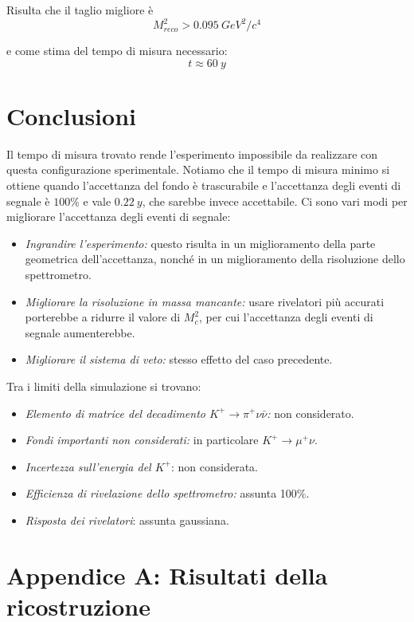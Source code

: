 \documentclass[8pt]{extarticle}
\begin{document}
Risulta che il taglio migliore è 
$$
M^2_{reco} > 0.095\ GeV^2/c^4
$$

e come stima del tempo di misura necessario:
$$
t \approx 60\ y
$$

\newpage

\section{Conclusioni} \label{sec:conclusioni}

Il tempo di misura trovato rende l'esperimento impossibile da realizzare con questa configurazione sperimentale. Notiamo che il tempo di misura minimo si ottiene quando l'accettanza del fondo è trascurabile e l'accettanza degli eventi di segnale è $100\%$ e vale $0.22\ y$, che sarebbe invece accettabile. Ci sono vari modi per migliorare l'accettanza degli eventi di segnale:

\begin{itemize}
\item \textit{Ingrandire l'esperimento:} questo risulta in un miglioramento della parte geometrica dell'accettanza, nonché in un miglioramento della risoluzione dello spettrometro.
\item \textit{Migliorare la risoluzione in massa mancante:} usare rivelatori più accurati porterebbe a ridurre il valore di $M^2_c$, per cui l'accettanza degli eventi di segnale aumenterebbe.
\item \textit{Migliorare il sistema di veto:} stesso effetto del caso precedente.
\end{itemize}

Tra i limiti della simulazione si trovano:
\begin{itemize}
\item \textit{Elemento di matrice del decadimento $K^+ \rightarrow \pi^+ \nu \bar{\nu}$:} non considerato.
\item \textit{Fondi importanti non considerati:} in particolare $K^+ \rightarrow \mu^+ \nu$.
\item \textit{Incertezza sull'energia del $K^+$}: non considerata.
\item \textit{Efficienza di rivelazione dello spettrometro:} assunta 100\%.
\item \textit{Risposta dei rivelatori}: assunta gaussiana.
\end{itemize}

\section{Appendice A: Risultati della ricostruzione} \label{sec:grafici}
\end{document}
